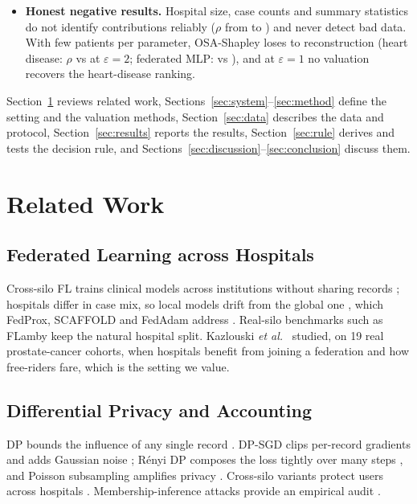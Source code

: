 \documentclass[journal]{IEEEtran}
\begin{document}
\begin{itemize}
    \item \textbf{Honest negative results.} Hospital size, case counts and summary statistics do not identify contributions reliably ($\rho$ from \hrSizeNoDP{} to \pxSSizeNoDP{}) and never detect bad data. With few patients per parameter, OSA-Shapley loses to reconstruction (heart disease: $\rho$ \hrOsaTwo{} vs \hrMrTwo{} at $\varepsilon=2$; federated MLP: \mlpOsaTwo{} vs \mlpMrTwo{}), and at $\varepsilon=1$ no valuation recovers the heart-disease ranking.
\end{itemize}
Section~\ref{sec:related} reviews related work, Sections~\ref{sec:system}--\ref{sec:method} define the setting and the valuation methods, Section~\ref{sec:data} describes the data and protocol, Section~\ref{sec:results} reports the results, Section~\ref{sec:rule} derives and tests the decision rule, and Sections~\ref{sec:discussion}--\ref{sec:conclusion} discuss them.

\section{Related Work}
\label{sec:related}

\subsection{Federated Learning across Hospitals}
Cross-silo FL trains clinical models across institutions without sharing records \cite{Rieke2020DigitalHealth, Sheller2020MedicineFL, Li2021SurveyFLMedical, Pati2022GFLMedical}; hospitals differ in case mix, so local models drift from the global one \cite{Kairouz2021FLAdvances, Zhao2018NonIID, Wang2021FieldGuide}, which FedProx, SCAFFOLD and FedAdam address \cite{Li2020FedProx, Karimireddy2020Scaffold, Reddi2021FedOpt, Wang2020FedNova}. Real-silo benchmarks such as FLamby \cite{Terrail2022FLamby} keep the natural hospital split. Kazlouski \emph{et al.}\ \cite{Kazlouski2025HospitalParticipation} studied, on 19 real prostate-cancer cohorts, when hospitals benefit from joining a federation and how free-riders fare, which is the setting we value.

\subsection{Differential Privacy and Accounting}
DP bounds the influence of any single record \cite{Dwork2006CalibratingNoise, Dwork2008DPSurvey}. DP-SGD clips per-record gradients and adds Gaussian noise \cite{Abadi2016DPSGD}; R\'enyi DP composes the loss tightly over many steps \cite{Mironov2017RDP}, and Poisson subsampling amplifies privacy \cite{Mironov2019SampledGaussian, Balle2018Amplification}. Cross-silo variants protect users across hospitals \cite{Kato2024ULDP}. Membership-inference attacks provide an empirical audit \cite{Shokri2017MIA, Bai2025MIA, Zhu2025FedMIA}.
\end{document}
